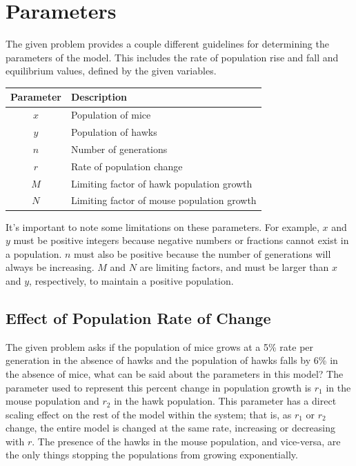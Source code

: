 \documentclass[10pt,letterpaper]{article}
\begin{document}
	\section{Parameters}
		The given problem provides a couple different guidelines for determining the parameters of the model. This includes the rate of population rise and fall and equilibrium values, defined by the given variables. 
		\begin{center}
			\begin{tabular}{c l}
				Parameter & Description \\
				\hline \hline
				$x$ & Population of mice \\
				$y$ & Population of hawks \\
				$n$ & Number of generations \\
				$r$ & Rate of population change \\
				$M$ & Limiting factor of hawk population growth\\
				$N$ & Limiting factor of mouse population growth\\
			 \end{tabular}
		\end{center}
		It's important to note some limitations on these parameters. For example, $x$ and $y$ must be positive integers because negative numbers or fractions cannot exist in a population. $n$ must also be positive because the number of generations will always be increasing. $M$ and $N$ are limiting factors, and must be larger than $x$ and $y$, respectively, to maintain a positive population. 
		\subsection{Effect of Population Rate of Change}
			The given problem asks if the population of mice grows at a 5\% rate per generation in the absence of hawks and the population of hawks falls by 6\% in the absence of mice, what can be said about the parameters in this model?
			\newline \newline
			The parameter used to represent this percent change in population growth is $r_{1}$ in the mouse population and $r_{2}$ in the hawk population. This parameter has a direct scaling effect on the rest of the model within the system; that is, as $r_{1}$ or $r_{2}$ change, the entire model is changed at the same rate, increasing or decreasing with $r$. The presence of the hawks in the mouse population, and vice-versa, are the only things stopping the populations from growing exponentially. 
\end{document}
